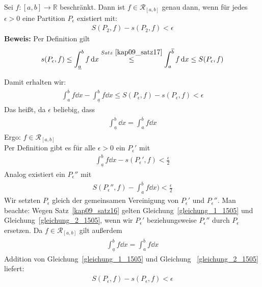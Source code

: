 
\begin{Satz}{\label{kap_10_satz18}
	Sei $f: [a,b] \rightarrow \mathbb{R}$ beschränkt. Dann ist 
	$f \in \mathcal{R}_{[a,b]}$ genau dann, wenn für jedes $\epsilon > 0$ eine 
	Partition $P_{\epsilon}$ existiert mit:
	\begin{align*}
		S(P_2,f) - s(P_2,f) < \epsilon
	\end{align*}
	\textbf{Beweis:} Per Definition gilt 
	\begin{align*}
		s(P_{\epsilon},f) \leq \int_{\underline{a}}^b f \dd{x}
		\overset{Satz~\ref{kap09_satz17}}{\le} \int_a^{\overline{b}} f \dd{x} 
		\leq S(P_{\epsilon},f) 		
	\end{align*}

	Damit erhalten wir:
	\begin{align*}
		\int_a^{\overline{b}} f \dd{x} - 
		\int_{\underline{a}}^b f \dd{x} \leq S(P_{\epsilon},f) 
		- s(P_{\epsilon},f) < \epsilon
	\end{align*}
	Das heißt, da $\epsilon$ beliebig, dass
	\begin{align*}
		\int_{\underline{a}}^b \dd{x} = \int_a^{\overline{b}} f \dd{x}
	\end{align*}
	Ergo: $f \in \mathcal{R}_{[a,b]}$ \\
	Per Definition gibt es für alle $\epsilon > 0$ ein $P_{\epsilon}'$ mit 
	\begin{align}
		\label{gleichung_1_1505}
		\int_{\underline{a}}^b f \dd{x} - s(P_{\epsilon}',f) < \frac{\epsilon}{2} 
	\end{align}
	Analog existiert ein $P_{\epsilon}''$ mit 
	\begin{align}
		\label{gleichung_2_1505}
		S(P_{\epsilon}'',f) - \int_a^{\overline{b}} f \dd{x}) < \frac{\epsilon}{2}
	\end{align}
	Wir setzten $P_{\epsilon}$ gleich der gemeinsamen Vereinigung von 
	$P_{\epsilon}'$ und $P_{\epsilon}''$. Man beachte: Wegen Satz~\ref{kap09_satz16} 
	gelten Gleichung~\ref{gleichung_1_1505} und Gleichung~\ref{gleichung_2_1505},
	wenn wir $P_{\epsilon}'$ beziehungsweise $P_{\epsilon}''$ durch $P_{\epsilon}$
	ersetzen. Da $f \in \mathcal{R}_{[a,b]}$ gilt außerdem 
	\begin{align*}
		\int_{\underline{a}}^b f \dd{x} = \int_a^{\overline{b}} f\dd{x}
	\end{align*}	 
	Addition von Gleichung~\ref{gleichung_1_1505} und Gleichung~
	\ref{gleichung_2_1505} liefert:
	\begin{align*}
	S(P_{\epsilon},f) - s(P_{\epsilon},f) < \epsilon
	\end{align*}
}\end{Satz}

